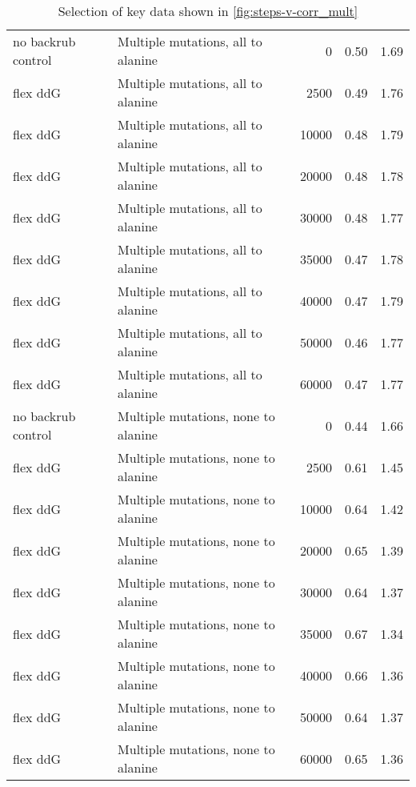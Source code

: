\begin{table}
\begin{tabular}{llrrr}
 no backrub control &   Multiple mutations, all to alanine &             0 & 0.50 & 1.69 \\
           flex ddG &   Multiple mutations, all to alanine &          2500 & 0.49 & 1.76 \\
           flex ddG &   Multiple mutations, all to alanine &         10000 & 0.48 & 1.79 \\
           flex ddG &   Multiple mutations, all to alanine &         20000 & 0.48 & 1.78 \\
           flex ddG &   Multiple mutations, all to alanine &         30000 & 0.48 & 1.77 \\
           flex ddG &   Multiple mutations, all to alanine &         35000 & 0.47 & 1.78 \\
           flex ddG &   Multiple mutations, all to alanine &         40000 & 0.47 & 1.79 \\
           flex ddG &   Multiple mutations, all to alanine &         50000 & 0.46 & 1.77 \\
           flex ddG &   Multiple mutations, all to alanine &         60000 & 0.47 & 1.77 \\
 no backrub control &  Multiple mutations, none to alanine &             0 & 0.44 & 1.66 \\
           flex ddG &  Multiple mutations, none to alanine &          2500 & 0.61 & 1.45 \\
           flex ddG &  Multiple mutations, none to alanine &         10000 & 0.64 & 1.42 \\
           flex ddG &  Multiple mutations, none to alanine &         20000 & 0.65 & 1.39 \\
           flex ddG &  Multiple mutations, none to alanine &         30000 & 0.64 & 1.37 \\
           flex ddG &  Multiple mutations, none to alanine &         35000 & 0.67 & 1.34 \\
           flex ddG &  Multiple mutations, none to alanine &         40000 & 0.66 & 1.36 \\
           flex ddG &  Multiple mutations, none to alanine &         50000 & 0.64 & 1.37 \\
           flex ddG &  Multiple mutations, none to alanine &         60000 & 0.65 & 1.36 \\
\bottomrule
\end{tabular}

\caption[]{Selection of key data shown in \cref{fig:steps-v-corr_mult}}
\label{tab:steps-v-corr_mult-underlying-data}
\end{table}
